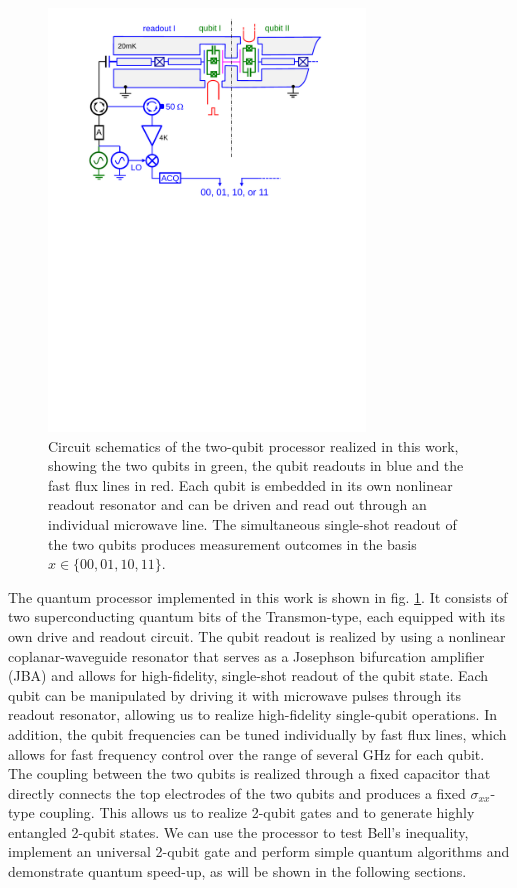 \begin{figure}[ht!]
	\centering
		\includegraphics[width=0.75\textwidth]{./material/papers/grover/figures/2_qubit_processor_schematic}
	\caption[Circuit schematics of the realized 2-qubit processor]{Circuit schematics of the two-qubit processor realized in this work, showing the two qubits in green, the qubit readouts in blue and the fast flux lines in red. Each qubit is embedded in its own nonlinear readout resonator and can be driven and read out through an individual microwave line. The simultaneous single-shot readout of the two qubits produces measurement outcomes in the basis $x \in \{00,01,10,11\}$.}
	\label{fig:two_qubit_processor_schematic}
\end{figure}

The quantum processor implemented in this work is shown in fig. \ref{fig:two_qubit_processor_schematic}. It consists of two superconducting quantum bits of the Transmon-type, each equipped with its own drive and readout circuit. The qubit readout is realized by using a nonlinear coplanar-waveguide resonator that serves as a Josephson bifurcation amplifier (JBA) and allows for high-fidelity, single-shot readout of the qubit state. Each qubit can be manipulated by driving it with microwave pulses through its readout resonator, allowing us to realize high-fidelity single-qubit operations. In addition, the qubit frequencies can be tuned individually by fast flux lines, which allows for fast frequency control over the range of several GHz for each qubit. The coupling between the two qubits is realized through a fixed capacitor that directly connects the top electrodes of the two qubits and produces a fixed $\sigma_{xx}$-type coupling. This allows us to realize 2-qubit gates and to generate highly entangled 2-qubit states. We can use the processor to test Bell's inequality, implement an universal 2-qubit gate and perform simple quantum algorithms and demonstrate quantum speed-up, as will be shown in the following sections.

